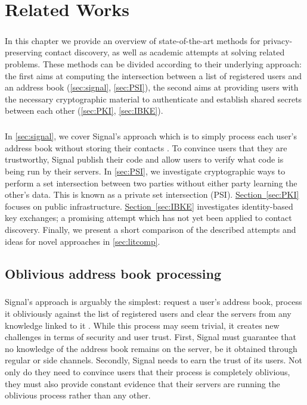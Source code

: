 \chapter{Related Works}
\label{chap:litreview}

\paragraph{} In this chapter we provide an overview of state-of-the-art methods for privacy-preserving contact discovery, as well as academic attempts at solving related problems. These methods can be divided according to their underlying approach: the first aims at computing the intersection between a list of registered users and an address book (\autoref{sec:signal}, \autoref{sec:PSI}), the second aims at providing users with the necessary cryptographic material to authenticate and establish shared secrets between each other (\autoref{sec:PKI}, \autoref{sec:IBKE}).


\paragraph{} In \autoref{sec:signal}, we cover Signal's approach which is to simply process each user's address book without storing their contacts \cite{Signal:Tech}. To convince users that they are trustworthy, Signal publish their code and allow users to verify what code is being run by their servers. In \autoref{sec:PSI}, we investigate cryptographic ways to perform a set intersection between two parties without either party learning the other's data. This is known as a private set intersection (PSI). \hyperref[sec:PKI]{Section~\ref*{sec:PKI}} focuses on public infrastructure. \hyperref[sec:IBKE]{Section~\ref*{sec:IBKE}} investigates identity-based key exchanges; a promising attempt which has not yet been applied to contact discovery. Finally, we present a short comparison of the described attempts and ideas for novel approaches in \autoref{sec:litcomp}.

\section{Oblivious address book processing}
\label{sec:signal}


\paragraph{} Signal's approach is arguably the simplest: request a user's address book, process it obliviously against the list of registered users and clear the servers from any knowledge linked to it \cite{Signal:Tech}. While this process may seem trivial, it creates new challenges in terms of security and user trust. First, Signal must guarantee that no knowledge of the address book remains on the server, be it obtained through regular or side channels. Secondly, Signal needs to earn the trust of its users. Not only do they need to convince users that their process is completely oblivious, they must also provide constant evidence that their servers are running the oblivious process rather than any other.

